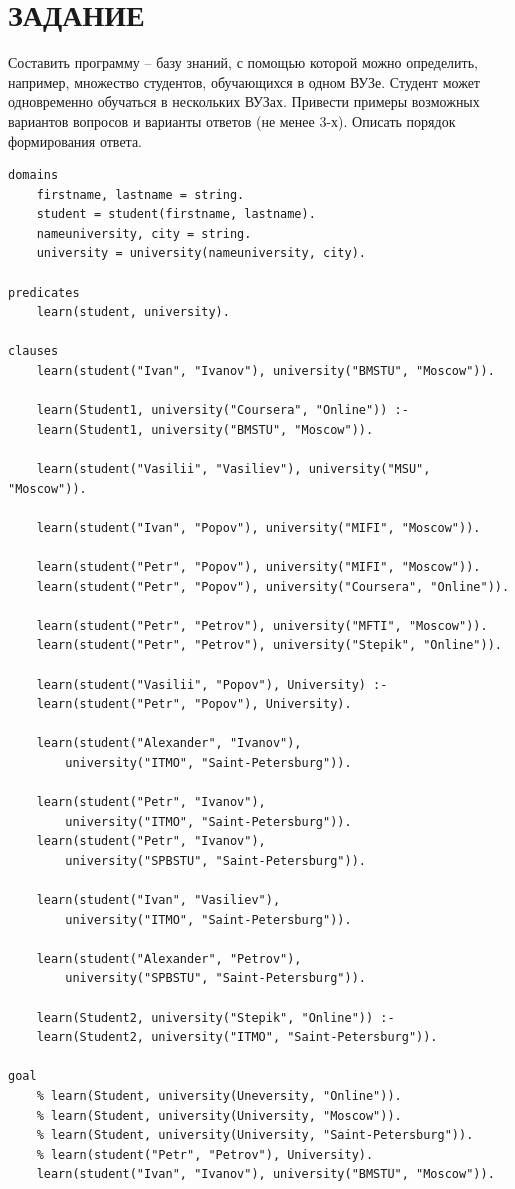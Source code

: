 \section{ЗАДАНИЕ}

Составить программу -- базу знаний, с помощью которой можно определить, например, множество студентов, обучающихся в одном ВУЗе. Студент может одновременно обучаться в нескольких ВУЗах. Привести примеры возможных вариантов вопросов и варианты ответов (не менее 3-х). Описать порядок формирования ответа.

\begin{lstlisting}[caption=Текст программы]
domains
	firstname, lastname = string.
	student = student(firstname, lastname).
	nameuniversity, city = string.
	university = university(nameuniversity, city).

predicates
	learn(student, university).

clauses
	learn(student("Ivan", "Ivanov"), university("BMSTU", "Moscow")).
	
	learn(Student1, university("Coursera", "Online")) :-
	learn(Student1, university("BMSTU", "Moscow")).

	learn(student("Vasilii", "Vasiliev"), university("MSU", "Moscow")).

	learn(student("Ivan", "Popov"), university("MIFI", "Moscow")).
	
	learn(student("Petr", "Popov"), university("MIFI", "Moscow")).
	learn(student("Petr", "Popov"), university("Coursera", "Online")).

	learn(student("Petr", "Petrov"), university("MFTI", "Moscow")).
	learn(student("Petr", "Petrov"), university("Stepik", "Online")).
	
	learn(student("Vasilii", "Popov"), University) :-
	learn(student("Petr", "Popov"), University).

	learn(student("Alexander", "Ivanov"),
		university("ITMO", "Saint-Petersburg")).

	learn(student("Petr", "Ivanov"),
		university("ITMO", "Saint-Petersburg")).
	learn(student("Petr", "Ivanov"),
		university("SPBSTU", "Saint-Petersburg")).

	learn(student("Ivan", "Vasiliev"),
		university("ITMO", "Saint-Petersburg")).

	learn(student("Alexander", "Petrov"),
		university("SPBSTU", "Saint-Petersburg")).

	learn(Student2, university("Stepik", "Online")) :-
	learn(Student2, university("ITMO", "Saint-Petersburg")).
	
goal
	% learn(Student, university(Uneversity, "Online")).
	% learn(Student, university(University, "Moscow")).
	% learn(Student, university(University, "Saint-Petersburg")).
	% learn(student("Petr", "Petrov"), University).
	learn(student("Ivan", "Ivanov"), university("BMSTU", "Moscow")).
\end{lstlisting}

